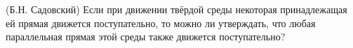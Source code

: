 (Б.Н. Садовский)
Если при движении твёрдой среды некоторая принадлежащая ей прямая
движется поступательно, то можно ли утверждать, что любая параллельная
прямая этой среды также движется поступательно?
